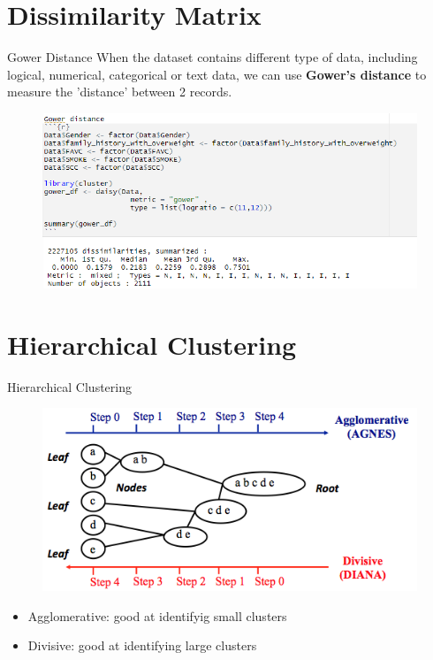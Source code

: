 \documentclass[11pt]{beamer}
\begin{document}
\section{Dissimilarity Matrix}
\begin{frame}{Gower Distance}
When the dataset contains different type of data, including logical, numerical, categorical or text data, we can use \textbf{Gower's distance}\cite{gower1971general} to measure the 'distance' between 2 records. 
\begin{figure}
    \centering
    \includegraphics[width=1\linewidth]{images/Gower_dis.png}
    \label{fig:gower}
\end{figure}

\end{frame}

\section{Hierarchical Clustering}
\begin{frame}{Hierarchical Clustering}

    \begin{figure}
        \centering
        \includegraphics{images/hierarchical-clustering-agnes-diana.png}
        \caption{\cite{boehmke2018uc}}
        \label{fig:hie}
    \end{figure}

    \begin{itemize}
        \item Agglomerative: good at identifyig small clusters
        \item Divisive: good at identifying large clusters
    \end{itemize}
\end{frame}
\end{document}

